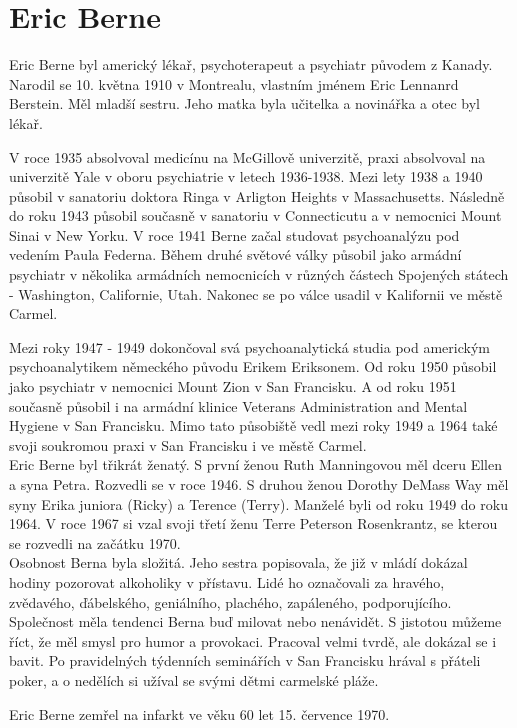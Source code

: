 \chapter{Eric Berne}

Eric Berne byl americký lékař, psychoterapeut a
psychiatr původem z Kanady.
Narodil se 10. května 1910 v Montrealu, vlastním jménem Eric Lennanrd Berstein.
Měl mladší sestru. 
Jeho matka byla učitelka a novinářka a otec byl lékař.

V roce 1935 absolvoval medicínu na McGillově univerzitě, praxi absolvoval na univerzitě Yale v oboru psychiatrie v letech 1936-1938. 
Mezi lety 1938 a 1940 působil v sanatoriu doktora Ringa v Arligton Heights v Massachusetts. 
Následně do roku 1943 působil současně v sanatoriu v Connecticutu a v nemocnici Mount Sinai v New Yorku. 
V roce 1941 Berne začal studovat psychoanalýzu pod vedením Paula Federna.
Během druhé světové války působil jako armádní psychiatr v několika armádních nemocnicích v různých částech Spojených státech - Washington, Californie, Utah. 
Nakonec se po válce usadil v Kalifornii ve městě Carmel.

Mezi roky 1947 - 1949 dokončoval svá psychoanalytická studia pod americkým psychoanalytikem německého původu Erikem Eriksonem.
Od roku 1950 působil jako psychiatr v nemocnici Mount Zion v San Francisku. 
A od roku 1951 současně působil i na armádní klinice Veterans Administration and Mental Hygiene v San Francisku. 
Mimo tato působiště vedl mezi roky 1949 a 1964 také svoji soukromou praxi v San Francisku i ve městě Carmel.\\


Eric Berne byl třikrát ženatý. S první ženou Ruth Manningovou měl dceru Ellen a syna Petra. 
Rozvedli se v roce 1946. S druhou ženou Dorothy DeMass Way měl syny Erika juniora (Ricky) a Terence (Terry).
Manželé byli od roku 1949 do roku 1964. 
V roce 1967 si vzal svoji třetí ženu Terre Peterson Rosenkrantz, se kterou se rozvedli na začátku 1970.\\

Osobnost Berna byla složitá. Jeho sestra popisovala, že již v mládí dokázal hodiny pozorovat alkoholiky v přístavu. 
Lidé ho označovali za hravého, zvědavého, ďábelského, geniálního, plachého, zapáleného, podporujícího. 
Společnost měla tendenci Berna buď milovat nebo nenávidět.
S jistotou můžeme říct, že měl smysl pro humor a provokaci. Pracoval velmi tvrdě, ale dokázal se i bavit. Po pravidelných týdenních seminářích v San Francisku hrával s přáteli poker, a o nedělích si užíval se svými dětmi carmelské pláže.

Eric Berne zemřel na infarkt ve věku 60 let 15. července 1970. \cite{berne_biography_official, berne_biography_eata, berne_wikipedia}

